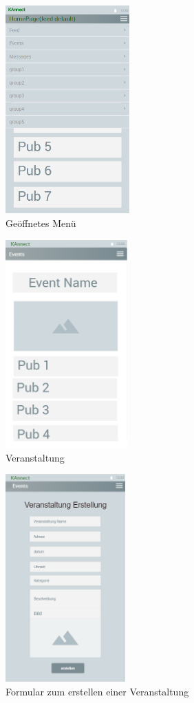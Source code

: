 \documentclass[parskip=full]{scrartcl}
\begin{document}
		\begin{figure}[h]
			\centering
			\includegraphics[height=8cm]{MenuOpened}
			\caption{Geöffnetes Menü}
			\label{OffenesMenü}
		\end{figure}
				
		\begin{figure}[h]
			\centering
			\includegraphics[height=8cm]{Event}
			\caption{Veranstaltung}
			\label{Veranstaltung}
		\end{figure}
			
			
		\begin{figure}[h]
			\centering
			\includegraphics[height=8cm]{FormularVeranstaltung}
			\caption{Formular zum erstellen einer Veranstaltung}
			\label{FormularVeranstaltung}
		\end{figure}
		
\end{document}
